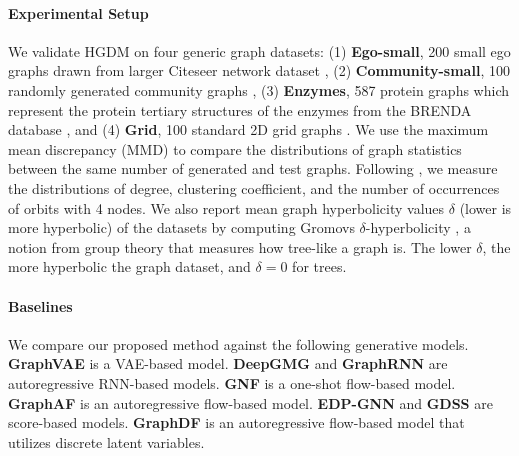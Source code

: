 \documentclass[letterpaper]{article} %
\begin{document}
\paragraph{Experimental Setup}
We validate HGDM on four generic graph datasets: (1) \textbf{Ego-small}, 200 small ego graphs drawn from larger Citeseer network dataset \cite{sen2008collective}, (2) \textbf{Community-small}, 100 randomly generated community graphs \cite{jo2022score}, (3) \textbf{Enzymes}, 587 protein graphs which represent the protein tertiary structures of the enzymes from the BRENDA database \cite{schomburg2004brenda}, and (4) \textbf{Grid}, 100 standard 2D grid graphs \cite{jo2022score}. We use the maximum mean discrepancy (MMD) to compare the distributions of graph statistics between the same number of generated and test graphs. Following \citet{jo2022score}, we measure the distributions of degree, clustering coefficient, and the number of occurrences of orbits with 4 nodes. We also report mean graph hyperbolicity values $\delta$ (lower is more hyperbolic) of the datasets by computing Gromovs $\delta$-hyperbolicity \cite{adcock2013tree}, a notion from group theory that measures how tree-like a graph is. The lower $\delta$, the more hyperbolic the graph dataset, and $\delta=0$ for trees.

\paragraph{Baselines}
We compare our proposed method against the following generative models. \textbf{GraphVAE} \cite{simonovsky2018graphvae} is a VAE-based model. \textbf{DeepGMG} \cite{li2018learning} and \textbf{GraphRNN} \cite{you2018graphrnn} are autoregressive RNN-based models. \textbf{GNF} \cite{liu2019graph} is a one-shot flow-based model. \textbf{GraphAF} \cite{shi2020graphaf} is an autoregressive flow-based model. \textbf{EDP-GNN} \cite{niu2020permutation} and \textbf{GDSS} \cite{jo2022score} are score-based models. \textbf{GraphDF} \cite{luo2021graphdf} is an autoregressive flow-based model that utilizes discrete latent variables.
\end{document}
